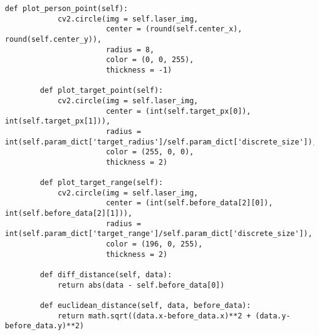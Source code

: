 \begin{lstlisting}[caption=person\_detector.py, label=person]
        def plot_person_point(self):
            cv2.circle(img = self.laser_img,
                       center = (round(self.center_x), round(self.center_y)),
                       radius = 8,
                       color = (0, 0, 255),
                       thickness = -1)
    
        def plot_target_point(self):
            cv2.circle(img = self.laser_img,
                       center = (int(self.target_px[0]), int(self.target_px[1])),
                       radius = int(self.param_dict['target_radius']/self.param_dict['discrete_size']),
                       color = (255, 0, 0),
                       thickness = 2)
    
        def plot_target_range(self):
            cv2.circle(img = self.laser_img,
                       center = (int(self.before_data[2][0]), int(self.before_data[2][1])),
                       radius = int(self.param_dict['target_range']/self.param_dict['discrete_size']),
                       color = (196, 0, 255),
                       thickness = 2)
    
        def diff_distance(self, data):
            return abs(data - self.before_data[0])
    
        def euclidean_distance(self, data, before_data):
            return math.sqrt((data.x-before_data.x)**2 + (data.y-before_data.y)**2)
    

\end{lstlisting}
